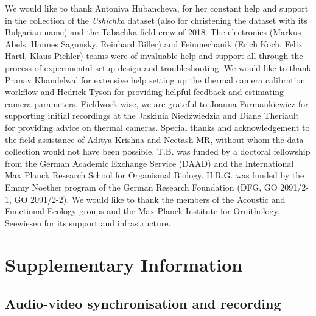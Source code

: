 \documentclass[
]{book}
\begin{document}
We would like to thank Antoniya Hubancheva, for her constant help and support in the collection of the \emph{Ushichka} dataset (also for christening the dataset with its Bulgarian name) and the Tabachka field crew of 2018. The electronics (Markus Abels, Hannes Sagunsky, Reinhard Biller) and Feinmechanik (Erich Koch, Felix Hartl, Klaus Pichler) teams were of invaluable help and support all through the process of experimental setup design and troubleshooting. We would like to thank Pranav Khandelwal for extensive help setting up the thermal camera calibration workflow and Hedrick Tyson for providing helpful feedback and estimating camera parameters. Fieldwork-wise, we are grateful to Joanna Furmankiewicz for supporting initial recordings at the Jaskinia Niedźwiedzia and Diane Theriault for providing advice on thermal cameras. Special thanks and acknowledgement to the field assistance of Aditya Krishna and Neetash MR, without whom the data collection would not have been possible. T.B. was funded by a doctoral fellowship from the German Academic Exchange Service (DAAD) and the International Max Planck Research School for Organismal Biology. H.R.G. was funded by the Emmy Noether program of the German Research Foundation (DFG, GO 2091/2-1, GO 2091/2-2). We would like to thank the members of the Acoustic and Functional Ecology groups and the Max Planck Institute for Ornithology, Seewiesen for its support and infrastructure.

\hypertarget{ushichkasi}{%
\section{Supplementary Information}\label{ushichkasi}}

\hypertarget{ushichkaavmatch}{%
\subsection{Audio-video synchronisation and recording}\label{ushichkaavmatch}}
\end{document}
